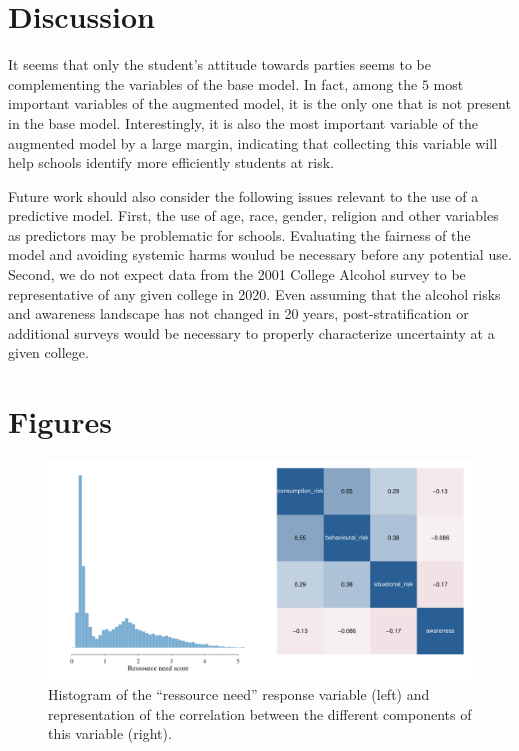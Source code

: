 \documentclass[10pt]{amsart}%
\begin{document}
\section{Discussion}
\label{sec:conclusion}

It seems that only the student's attitude towards parties seems to be complementing the variables of the base model. In fact, among the $5$ most important variables of the augmented model, it is the only one that is not present in the base model. Interestingly, it is also the most important variable of the augmented model by a large margin, indicating that collecting this variable will help schools identify more efficiently students at risk.

Future work should also consider the following issues relevant to the use of a predictive model. First, the use of age, race, gender, religion and other variables as predictors may be  problematic for schools. Evaluating the fairness of the model and avoiding systemic harms woulud be necessary before any potential use. Second, we do not expect data from the 2001 College Alcohol survey to be representative of any given college in 2020. Even assuming that the alcohol risks and awareness landscape has not changed in 20 years, post-stratification or additional surveys would be necessary to properly characterize uncertainty at a given college.


\newpage
\appendix

\section{Figures}

\begin{center}
\begin{figure}[h]
  \includegraphics[width=\linewidth]{Figures/response.pdf}
  \caption{Histogram of the ``ressource need'' response variable (left) and representation of the correlation between the different components of this variable (right).}
\end{figure}
\end{center}
\end{document}
